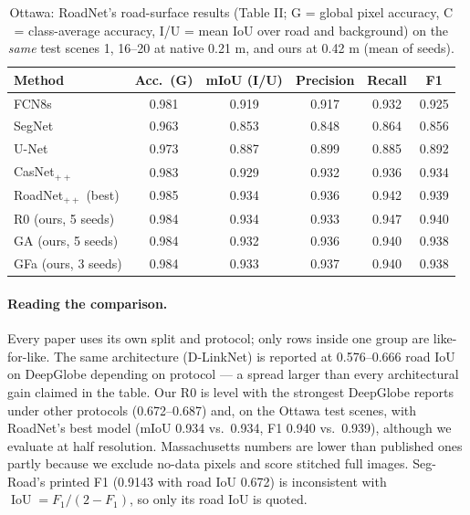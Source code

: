 \documentclass[11pt]{article}
\newcommand{\IoU}{\operatorname{IoU}}
\begin{document}
\begin{table}[H]
\centering
\caption{Ottawa: RoadNet's road-surface results \cite{liu2019roadnet} (Table II; G = global pixel
accuracy, C = class-average accuracy, I/U = mean IoU over road and background) on the \emph{same}
test scenes 1, 16--20 at native 0.21 m, and ours at 0.42 m (mean of seeds).}
\label{tab:ottawa}
\small
\begin{tabular}{@{}lccccc@{}}
\toprule
Method & Acc.\ (G) & mIoU (I/U) & Precision & Recall & F1 \\
\midrule
FCN8s \cite{liu2019roadnet} & 0.981 & 0.919 & 0.917 & 0.932 & 0.925 \\
SegNet & 0.963 & 0.853 & 0.848 & 0.864 & 0.856 \\
U-Net & 0.973 & 0.887 & 0.899 & 0.885 & 0.892 \\
CasNet$_{++}$ & 0.983 & 0.929 & 0.932 & 0.936 & 0.934 \\
RoadNet$_{++}$ (best) & 0.985 & 0.934 & 0.936 & 0.942 & 0.939 \\
\midrule
R0 (ours, 5 seeds) & 0.984 & 0.934 & 0.933 & 0.947 & 0.940 \\
GA (ours, 5 seeds) & 0.984 & 0.932 & 0.936 & 0.940 & 0.938 \\
GFa (ours, 3 seeds) & 0.984 & 0.933 & 0.937 & 0.940 & 0.938 \\
\bottomrule
\end{tabular}
\end{table}

\paragraph{Reading the comparison.} Every paper uses its own split and protocol; only rows inside one
group are like-for-like. The same architecture (D-LinkNet) is reported at 0.576--0.666 road IoU on
DeepGlobe depending on protocol --- a spread larger than every architectural gain claimed in the
table. Our R0 is level with the strongest DeepGlobe reports under other protocols (0.672--0.687) and,
on the Ottawa test scenes, with RoadNet's best model (mIoU 0.934 vs.\ 0.934, F1 0.940 vs.\ 0.939),
although we evaluate at half resolution. Massachusetts numbers are lower than published ones partly
because we exclude no-data pixels and score stitched full images. Seg-Road's printed F1 (0.9143 with
road IoU 0.672) is inconsistent with $\IoU = F_1/(2-F_1)$, so only its road IoU is quoted.

\end{document}
